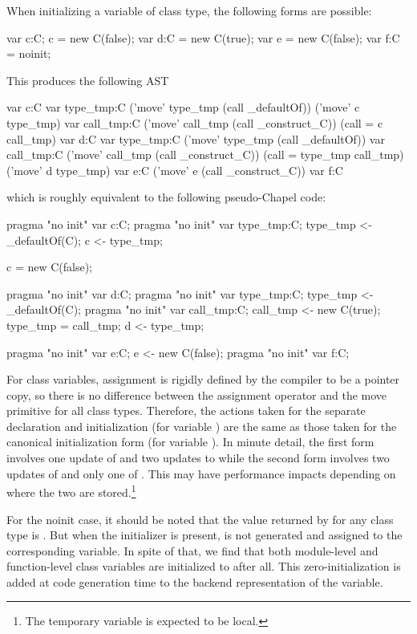 When initializing a variable of class type, the following forms are possible:
\begin{chapel}
  var c:C; c = new C(false);
  var d:C = new C(true);
  var e = new C(false);
  var f:C = noinit;
\end{chapel}
\noindent
This produces the following AST
\begin{numberedchapel}
    var c:C
    {
      var type_tmp:C
      ('move' type_tmp (call _defaultOf))
      ('move' c type_tmp)
    }
    var call_tmp:C
    ('move' call_tmp (call _construct_C))
    (call = c call_tmp)
    var d:C
    {
      var type_tmp:C
      ('move' type_tmp (call _defaultOf))
      var call_tmp:C
      ('move' call_tmp (call _construct_C))
      (call = type_tmp call_tmp)
      ('move' d type_tmp)
    }
    var e:C
    ('move' e (call _construct_C))
    var f:C
\end{numberedchapel}
\noindent
which is roughly equivalent to the following pseudo-Chapel code:
\begin{chapel}
  pragma "no init" var c:C;
  pragma "no init" var type_tmp:C; type_tmp <- _defaultOf(C);
  c <- type_tmp;

  c = new C(false);

  pragma "no init" var d:C; 
  pragma "no init" var type_tmp:C; type_tmp <- _defaultOf(C);
  pragma "no init" var call_tmp:C; call_tmp <- new C(true);
  type_tmp = call_tmp;
  d <- type_tmp;

  pragma "no init" var e:C; e <- new C(false);
  pragma "no init" var f:C;
\end{chapel}
\noindent
For class variables, assignment is rigidly defined by the compiler to be a pointer copy,
so there is no difference between the assignment operator and the move primitive for all
class types.  Therefore, the actions taken for the separate declaration and initialization
(for variable ) are the same as those taken for the canonical initialization form
(for variable ).  In minute detail, the first form involves one update of
 and two updates to  while the second form involves two updates of
 and only one of .  This may have performance impacts depending on
where the two are stored.\footnote{The temporary variable  is expected to
  be local.}

For the noinit case, it should be noted that the value returned by  for
any class type is .  But when the  initializer is present,
 is not generated and assigned to the corresponding variable.  In spite of
that, we find that both module-level and function-level class variables are initialized to
 after all.  This zero-initialization is added at code generation time to the
backend representation of the variable.  

